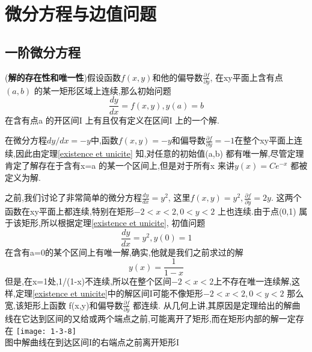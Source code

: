 \chapter{微分方程与边值问题}
\section{一阶微分方程}
\begin{theorem}
  ({\bf 解的存在性和唯一性})假设函数$f(x,y)$和他的偏导数$\frac{\partial f}{\partial y}$, 在xy平面上含有点$(a,b)$ 的某一矩形区域上连续,那么初始问题
  \begin{equation}
    \frac{dy}{dx}=f(x,y),y(a)=b
  \end{equation}
  在含有点a 的开区间I 上有且仅有定义在区间I 上的一个解.
  \label{existence et unicite}
\end{theorem}
\begin{example}
  在微分方程$dy/dx=-y$中,函数$f(x,y)=-y$和偏导数$\frac{\partial f}{\partial y}=-1$在整个xy平面上连续,因此由定理\ref{existence et unicite} 知,对任意的初始值(a,b) 都有唯一解,尽管定理肯定了解存在于含有x=a 的某一个区间上,但是对于所有x 来讲$y(x)=Ce^{-x}$ 都被定义为解.
\end{example}
\begin{note}
  之前,我们讨论了非常简单的微分方程$\frac{dy}{dx}=y^2$, 这里$f(x,y)=y^2,\frac{\partial f}{\partial y}=2y$. 这两个函数在xy平面上都连续,特别在矩形$-2<x<2,0<y<2 $ 上也连续.由于点(0,1) 属于该矩形,所以根据定理\ref{existence et unicite}, 初值问题
  \begin{equation}
    \frac{dy}{dx}=y^2,y(0)=1
  \end{equation}
  在含有a=0的某个区间上有唯一解,确实,他就是我们之前求过的解$$y(x)=\frac{1}{1-x}$$
  但是,在x=1处,1/(1-x)不连续,所以在整个区间$-2<x<2 $上不存在唯一连续解,这样,定理\ref{existence et unicite}中的解区间I可能不像矩形$-2<x<2,0<y<2$ 那么宽,该矩形上函数 f(x,y)和偏导数$\frac{\partial f}{\partial y}$ 都连续. 从几何上讲,其原因是定理给出的解曲线在它达到区间的又给或两个端点之前,可能离开了矩形,而在矩形内部的解一定存在 \newline
\texttt{[image: 1-3-8]}\\
图中解曲线在到达区间I的右端点之前离开矩形I
\end{note}
